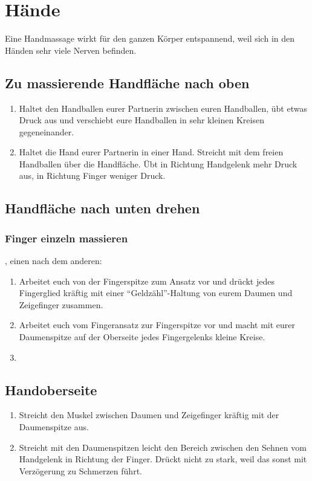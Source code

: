 \section{Hände}

Eine Handmassage wirkt für den ganzen Körper entspannend, weil sich in den Händen sehr viele Nerven befinden.

\subsection{Zu massierende Handfläche nach oben}
\begin{enumerate}
	\item {} Haltet den Handballen eurer Partnerin zwischen euren Handballen, übt etwas Druck aus und verschiebt eure Handballen in sehr kleinen Kreisen gegeneinander.
	\item {} Haltet die Hand eurer Partnerin in einer Hand. Streicht mit dem freien Handballen über die Handfläche. Übt in Richtung Handgelenk mehr Druck aus, in Richtung Finger weniger Druck.
\end{enumerate}


\subsection{Handfläche nach unten drehen}

\subsubsection{Finger einzeln massieren}

\begin{oframed}
	, einen nach dem anderen:
	\begin{enumerate}
		\item {} Arbeitet euch von der Fingerspitze zum Ansatz vor und drückt jedes Fingerglied kräftig mit einer "`Geldzähl"'-Haltung von eurem Daumen und Zeigefinger zusammen.
		\item {} Arbeitet euch vom Fingeransatz zur Fingerspitze vor und macht mit eurer Daumenspitze auf der Oberseite jedes Fingergelenks kleine Kreise.
		\item {}
	\end{enumerate}
\end{oframed}

\subsection{Handoberseite}
\begin{enumerate}
	\item {} Streicht den Muskel zwischen Daumen und Zeigefinger kräftig mit der Daumenspitze aus.
	\item {} Streicht mit den Daumenspitzen leicht den Bereich zwischen den Sehnen vom Handgelenk in Richtung der Finger. Drückt nicht zu stark, weil das sonst mit Verzögerung zu Schmerzen führt.
\end{enumerate}

